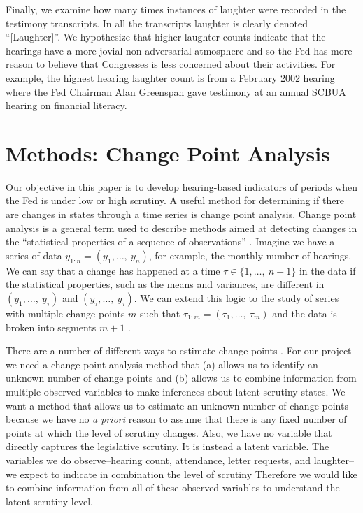 \documentclass[a4paper]{article}\usepackage[]{graphicx}\usepackage[]{color}
\begin{document}
Finally, we examine how many times instances of laughter were recorded in the testimony transcripts. In all the transcripts laughter is clearly denoted ``[Laughter]''. We hypothesize that higher laughter counts indicate that the hearings have a more jovial non-adversarial atmosphere and so the Fed has more reason to believe that Congresses is less concerned about their activities. For example, the highest hearing laughter count is from a February 2002 hearing where the Fed Chairman Alan Greenspan gave testimony at an annual SCBUA hearing on financial literacy.

\section{Methods: Change Point Analysis}

Our objective in this paper is to develop hearing-based indicators of periods when the Fed is under low or high scrutiny. A useful method for determining if there are changes in states through a time series is change point analysis. Change point analysis is a general term used to describe methods aimed at detecting changes in the ``statistical properties of a sequence of observations'' \cite[2]{Killick2013}. Imagine we have a series of data $y_{1:n} = (y_{1},\ldots,\: y_{n})$, for example, the monthly number of hearings.  We can say that a change has happened at a time $\tau \in \{1,\ldots,\:n-1\}$ in the data if the statistical properties, such as the means and variances, are different in $(y_{1},\ldots,\: y_{\tau})$ and $(y_{\tau},\ldots,\: y_{\tau})$. We can extend this logic to the study of series with multiple change points $m$ such that $\tau_{1:m} = (\tau_{1},\ldots,\:\tau_{m})$ and the data is broken into segments $m + 1$ \citep{Killick2012,Killick2013}.

There are a number of different ways to estimate change points \cite[see][]{Killick2013,Matteson2014}. For our project we need a change point analysis method that (a) allows us to identify an unknown number of change points and (b) allows us to combine information from multiple observed variables to make inferences about latent scrutiny states. We want a method that allows us to estimate an unknown number of change points because we have no \emph{a priori} reason to assume that there is any fixed number of points at which the level of scrutiny changes. Also, we have no variable that directly captures the legislative scrutiny. It is instead a latent variable. The variables we do observe--hearing count, attendance, letter requests, and laughter--we expect to indicate in combination the level of scrutiny  Therefore we would like to combine information from all of these observed variables to understand the latent scrutiny level.
\end{document}
